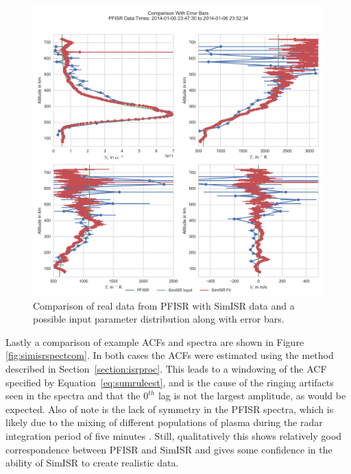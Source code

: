 \begin{figure}[h!]
\centering
\includegraphics[width=4.5in]{Paramcompeb}
\caption{Comparison of real data from PFISR with SimISR data and a possible input parameter distribution along with error bars.}
\label{fig:simisrparamcompeb}
\end{figure}

Lastly a comparison of example ACFs and spectra are shown in Figure \ref{fig:simisrspectcom}. In both cases the ACFs were estimated using the method described in Section~\ref{section:isrproc}. This leads to a windowing of the ACF specified by Equation~\ref{eq:sumruleest}, and is the cause of the ringing artifacts seen in the spectra and that the $0^{th}$ lag is not the largest amplitude, as would be expected. Also of note is the lack of symmetry in the PFISR spectra, which is likely due to the mixing of different populations of plasma during the radar integration period of five minutes \citep{knudsen1993}. Still, qualitatively this shows relatively good correspondence between PFISR and SimISR and gives some confidence in the ability of SimISR to create realistic data. 

